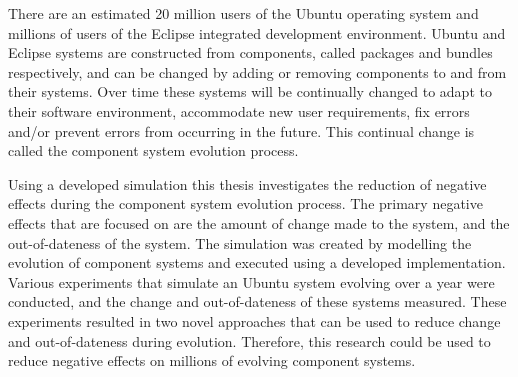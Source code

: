 There are an estimated 20 million users of the Ubuntu operating system and millions of users of the Eclipse integrated development environment.
Ubuntu and Eclipse systems are constructed from components, called packages and bundles respectively, 
and can be changed by adding or removing components to and from their systems. 
Over time these systems will be continually changed to adapt to their software environment, accommodate new user requirements, 
fix errors and/or prevent errors from occurring in the future.
This continual change is called the component system evolution process.

Using a developed simulation this thesis investigates the reduction of negative effects during the component system evolution process.
The primary negative effects that are focused on are the amount of change made to the system,
and the out-of-dateness of the system. 
The simulation was created by modelling the evolution of component systems and executed using a developed implementation.
Various experiments that simulate an Ubuntu system evolving over a year were conducted, and the change and out-of-dateness of these systems measured.
These experiments resulted in two novel approaches that can be used to reduce change and out-of-dateness during evolution.
Therefore, this research could be used to reduce negative effects on millions of evolving component systems. 


